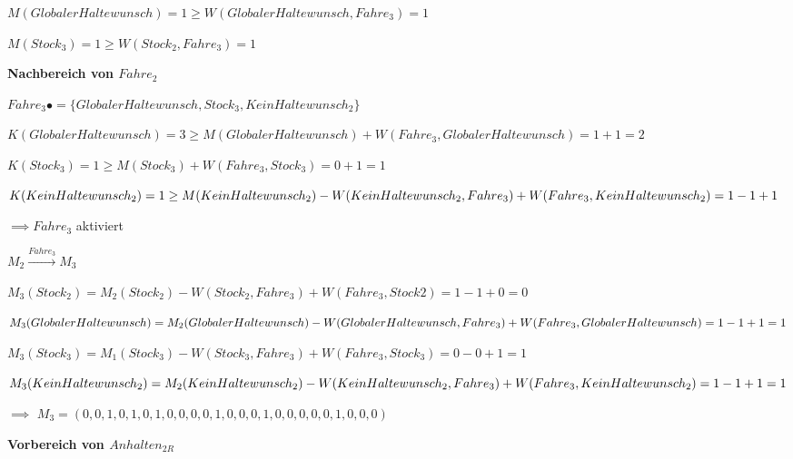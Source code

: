\documentclass{scrreprt}
\begin{document}
\begin{enumerate}
\begin{addmargin}[1cm]{0cm}
  $M(GlobalerHaltewunsch) = 1 \geq W(GlobalerHaltewunsch, Fahre_3) = 1$

  $M(Stock_3) = 1 \geq W(Stock_2, Fahre_3) = 1$
\end{addmargin}

\textbf{Nachbereich von $Fahre_2$}

\begin{addmargin}[1cm]{0cm}
  $Fahre_3 \bullet = \{ GlobalerHaltewunsch, Stock_3, KeinHaltewunsch_2 \}$

  $K(GlobalerHaltewunsch) = 3 \geq M(GlobalerHaltewunsch) + W(Fahre_3, GlobalerHaltewunsch) = 1 + 1 = 2$ 

  $K(Stock_3) = 1 \geq M(Stock_3) + W(Fahre_3, Stock_3) = 0 + 1 = 1$

  $K(KeinHaltewunsch_2) = 1 \geq M(KeinHaltewunsch_2) - \\ W(KeinHaltewunsch_2, Fahre_3) + \\ W(Fahre_3, KeinHaltewunsch_2) = 1 - 1 + 1$

  $\implies Fahre_3$ aktiviert
\end{addmargin}


$M_2 \xrightarrow{Fahre_3} M_3$

\begin{addmargin}[1cm]{0cm}
  $M_3(Stock_2) = M_2(Stock_2) - W(Stock_2, Fahre_3) + W(Fahre_3, Stock2) = 1 - 1 + 0 = 0$

  $M_3(GlobalerHaltewunsch) = M_2(GlobalerHaltewunsch) - \\ W(GlobalerHaltewunsch, Fahre_3) + \\ W(Fahre_3, GlobalerHaltewunsch) = 1 - 1 + 1 = 1$

  $M_3(Stock_3) = M_1(Stock_3) - W(Stock_3, Fahre_3) + W(Fahre_3, Stock_3) = 0 - 0 + 1 = 1$

  $M_3(KeinHaltewunsch_2) = M_2(KeinHaltewunsch_2) - \\ W(KeinHaltewunsch_2, Fahre_3) + \\ W(Fahre_3, KeinHaltewunsch_2) = 1 - 1 + 1 = 1$

  $\implies$ 
  $M_3 = (
  0, 0, 1, 0, 1, 
  0, 1, 0, 0, 0, 
  0, 1, 0, 0, 0, 
  1, 0, 0, 0, 0, 
  0, 1, 0, 0, 0
  )$
\end{addmargin}


\textbf{Vorbereich von $Anhalten_{2R}$}


\end{enumerate}
\end{document}
